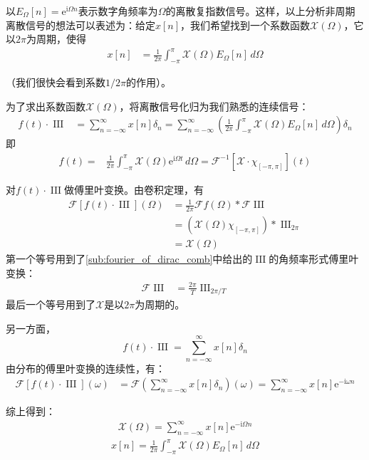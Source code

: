 \documentclass{ctexbook}
\newcommand{\shah}{\operatorname{III}}
\begin{document}
以$E_{\Omega}[n]=\mathrm{e}^{\mathrm{i}\Omega n}$表示数字角频率为$\Omega$的离散复指数信号。这样，以上分析非周期离散信号的想法可以表述为：给定$x[n]$，我们希望找到一个系数函数$\mathcal{X} (\Omega)$，它以$2\pi$为周期，使得\begin{align*}
    x[n]&=\frac{1}{2\pi}\int_{-\pi}^{\pi}\mathcal{X} (\Omega)E_{\Omega}[n]\,d\Omega
\end{align*}

（我们很快会看到系数$1/2\pi$的作用）。

为了求出系数函数$\mathcal{X} (\Omega)$，将离散信号化归为我们熟悉的连续信号：
\begin{align*}
    f(t)\cdot\shah&=\sum_{n=-\infty}^{\infty}x[n]\delta_{n}=\sum_{n=-\infty}^{\infty}\left(\frac{1}{2\pi}\int_{-\pi}^{\pi}\mathcal{X} (\Omega)E_{\Omega}[n]\,d\Omega\right)\delta_{n}
\end{align*}
即\begin{align*}
    f(t)=&\frac{1}{2\pi}\int_{-\pi}^{\pi}\mathcal{X} (\Omega)\mathrm{e}^{\mathrm{i}\Omega t}\,d\Omega=\mathcal{F} ^{-1}[\mathcal{X}\cdot\chi_{[-\pi,\pi]}](t)
\end{align*}

对$f(t)\cdot\shah$做傅里叶变换。由卷积定理，有
\begin{align*}
    \mathcal{F} [f(t)\cdot\shah](\Omega)&=\frac{1}{2\pi}\mathcal{F} f(\Omega)*\mathcal{F} \shah\\
    &=\left(\mathcal{X} (\Omega)\chi_{[-\pi,\pi]}\right)*\shah_{2\pi}\\
    &=\mathcal{X} (\Omega)
\end{align*}
第一个等号用到了\ref{sub:fourier_of_dirac_comb}中给出的$\shah$的角频率形式傅里叶变换：
{\color{red}\begin{align*}
    \mathcal{F} \shah&=\frac{2\pi}{T}\shah_{2\pi/T}
\end{align*}}
最后一个等号用到了$\mathcal{X} $是以$2\pi$为周期的。

另一方面，
$$f(t)\cdot\shah=\sum_{n=-\infty}^{\infty}x[n]\delta_{n}$$
由分布的傅里叶变换的连续性，有：
\begin{align*}
    \mathcal{F} [f(t)\cdot\shah](\omega)&=\mathcal{F} \left(\sum_{n=-\infty}^{\infty}x[n]\delta_{n}\right)(\omega)=\sum_{n=-\infty}^{\infty}x[n]\mathrm{e}^{-\mathrm{i}\omega n}
\end{align*}

综上得到：\begin{align*}
    \mathcal{X} (\Omega)=\sum_{n=-\infty}^{\infty}x[n]\mathrm{e}^{-\mathrm{i}\Omega n}
\end{align*}
\begin{align*}
    x[n]=\frac{1}{2\pi}\int_{-\pi}^{\pi}\mathcal{X} (\Omega)E_{\Omega}[n]\,d\Omega
\end{align*}
\end{document}
